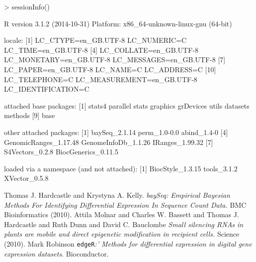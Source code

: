 \documentclass[a4paper]{article}
\begin{document}
\begin{Schunk}
\begin{Sinput}
> sessionInfo()
\end{Sinput}
\begin{Soutput}
R version 3.1.2 (2014-10-31)
Platform: x86_64-unknown-linux-gnu (64-bit)

locale:
 [1] LC_CTYPE=en_GB.UTF-8       LC_NUMERIC=C               LC_TIME=en_GB.UTF-8       
 [4] LC_COLLATE=en_GB.UTF-8     LC_MONETARY=en_GB.UTF-8    LC_MESSAGES=en_GB.UTF-8   
 [7] LC_PAPER=en_GB.UTF-8       LC_NAME=C                  LC_ADDRESS=C              
[10] LC_TELEPHONE=C             LC_MEASUREMENT=en_GB.UTF-8 LC_IDENTIFICATION=C       

attached base packages:
[1] stats4    parallel  stats     graphics  grDevices utils     datasets  methods  
[9] base     

other attached packages:
[1] baySeq_2.1.14         perm_1.0-0.0          abind_1.4-0          
[4] GenomicRanges_1.17.48 GenomeInfoDb_1.1.26   IRanges_1.99.32      
[7] S4Vectors_0.2.8       BiocGenerics_0.11.5  

loaded via a namespace (and not attached):
[1] BiocStyle_1.3.15 tools_3.1.2      XVector_0.5.8   
\end{Soutput}
\end{Schunk}


\begin{thebibliography}{99}
 Thomas J. Hardcastle and Krystyna A. Kelly. \textsl{baySeq: Empirical Bayesian Methods For Identifying Differential Expression In Sequence Count Data.} BMC Bioinformatics (2010).
 Attila Molnar and Charles W. Bassett and Thomas J. Hardcastle and Ruth Dunn and David C. Bauclombe \textsl{Small silencing RNAs in plants are mobile and direct epigenetic modification in recipient cells.} Science (2010).
 Mark Robinson \verb'edgeR'\textsl{:' Methods for differential expression in digital gene expression datasets}. Bioconductor.
\end{thebibliography}
\end{document}
